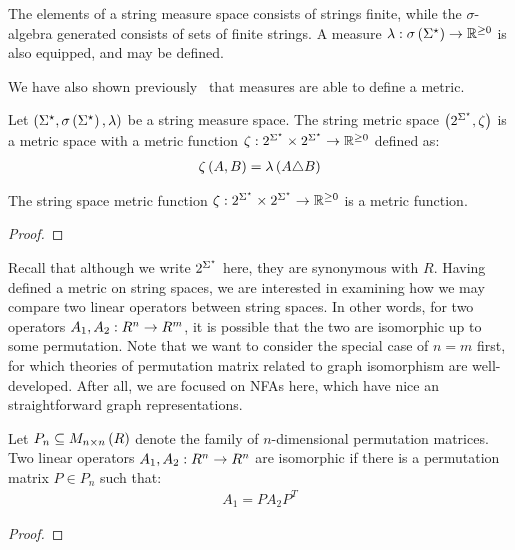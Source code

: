 The elements of a string measure space consists of strings finite,
while the \(\sigma\)-algebra generated consists of sets of finite strings.
A measure \(\lambda : \sigma\left(\Sigma^\star\right) \to \mathbb{R}^{\geq 0}\) is also
equipped, and may be defined.

We have also shown previously~\cite{xue2018langmeasures} that
measures are able to define a metric.

\begin{definition}
  Let
  \(\left(\Sigma^\star, \sigma\left(\Sigma^\star\right), \lambda\right)\)
  be a string measure space.
  The string metric space \(\left(2^{\Sigma^\star}, \zeta\right)\) is
  a metric space with a metric function
  \(\zeta : 2^{\Sigma^\star} \times 2^{\Sigma^\star} \to \mathbb{R}^{\geq 0}\)
  defined as:
  \begin{align*}
    \zeta \left(A, B\right)
      = \lambda\left(A \triangle B\right)
  \end{align*}
\end{definition}
\begin{theorem}
  The string space metric function
  \(\zeta : 2^{\Sigma^\star} \times 2^{\Sigma^\star} \to \mathbb{R}^{\geq 0}\)
  is a metric function.
\end{theorem}
\begin{proof}
\end{proof}

Recall that although we write \(2^{\Sigma^\star}\) here,
they are synonymous with \(R\).
Having defined a metric on string spaces,
we are interested in examining how we may compare two linear operators
between string spaces.
In other words, for two operators
\(A_1, A_2 : R^n \to R^m\), it is possible that
the two are isomorphic up to some permutation.
Note that we want to consider the special case of \(n = m\) first,
for which theories of permutation matrix related to
graph isomorphism are well-developed.
After all, we are focused on NFAs here,
which have nice an straightforward graph representations.

\begin{theorem}
  Let \(P_n \subseteq M_{n \times n}\left(R\right)\)
  denote the family of \(n\)-dimensional permutation matrices.
  Two linear operators
  \(A_1, A_2 : R^n \to R^n\) are isomorphic if
  there is a permutation matrix
  \(P \in P_n\) such that:
  \begin{align*}
    A_1 = P A_2 {P}^T
  \end{align*}
\end{theorem}
\begin{proof}
\end{proof}

